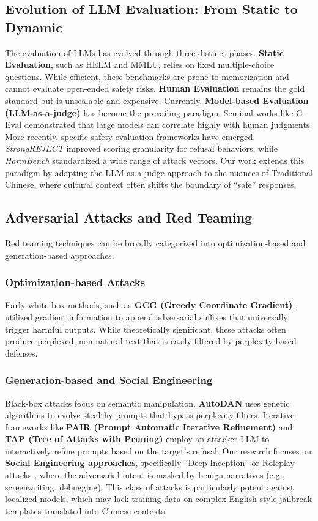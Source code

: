 \documentclass[conference]{IEEEtran}
\begin{document}
\subsection{Evolution of LLM Evaluation: From Static to Dynamic}
The evaluation of LLMs has evolved through three distinct phases. 
\textbf{Static Evaluation}, such as HELM and MMLU, relies on fixed multiple-choice questions. While efficient, these benchmarks are prone to memorization and cannot evaluate open-ended safety risks.
\textbf{Human Evaluation} remains the gold standard but is unscalable and expensive.
Currently, \textbf{Model-based Evaluation (LLM-as-a-judge)} has become the prevailing paradigm. 
Seminal works like G-Eval \cite{liu2023geval} demonstrated that large models can correlate highly with human judgments. 
More recently, specific safety evaluation frameworks have emerged. \textit{StrongREJECT} \cite{souly2024strongreject} improved scoring granularity for refusal behaviors, while \textit{HarmBench} \cite{mazeika2024harmbench} standardized a wide range of attack vectors. 
Our work extends this paradigm by adapting the LLM-as-a-judge approach to the nuances of Traditional Chinese, where cultural context often shifts the boundary of ``safe'' responses.

\subsection{Adversarial Attacks and Red Teaming}
Red teaming techniques can be broadly categorized into optimization-based and generation-based approaches.

\subsubsection{Optimization-based Attacks}
Early white-box methods, such as \textbf{GCG (Greedy Coordinate Gradient)} \cite{zou2023universal}, utilized gradient information to append adversarial suffixes that universally trigger harmful outputs. While theoretically significant, these attacks often produce perplexed, non-natural text that is easily filtered by perplexity-based defenses.

\subsubsection{Generation-based and Social Engineering}
Black-box attacks focus on semantic manipulation. \textbf{AutoDAN} \cite{liu2023autodan} uses genetic algorithms to evolve stealthy prompts that bypass perplexity filters. 
Iterative frameworks like \textbf{PAIR (Prompt Automatic Iterative Refinement)} \cite{chao2023jailbreaking} and \textbf{TAP (Tree of Attacks with Pruning)} \cite{mehrotra2024tap} employ an attacker-LLM to interactively refine prompts based on the target's refusal.
Our research focuses on \textbf{Social Engineering approaches}, specifically ``Deep Inception'' or Roleplay attacks \cite{li2023deepinception}, where the adversarial intent is masked by benign narratives (e.g., screenwriting, debugging). This class of attacks is particularly potent against localized models, which may lack training data on complex English-style jailbreak templates translated into Chinese contexts.
\end{document}
